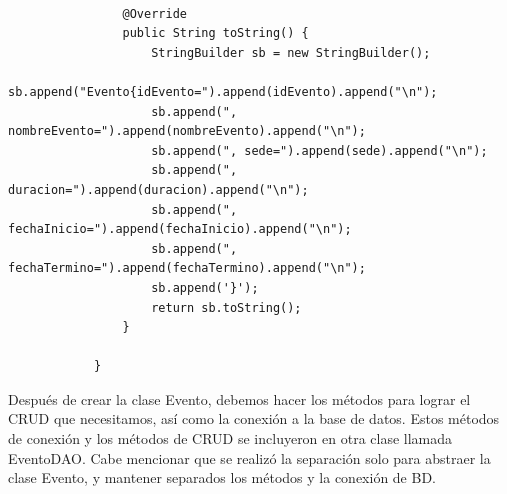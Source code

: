 \documentclass[10pt,a4paper]{article}
\begin{document}
\begin{lstlisting}
               
                @Override
                public String toString() {
                    StringBuilder sb = new StringBuilder();
                    sb.append("Evento{idEvento=").append(idEvento).append("\n");
                    sb.append(", nombreEvento=").append(nombreEvento).append("\n");
                    sb.append(", sede=").append(sede).append("\n");
                    sb.append(", duracion=").append(duracion).append("\n");
                    sb.append(", fechaInicio=").append(fechaInicio).append("\n");
                    sb.append(", fechaTermino=").append(fechaTermino).append("\n");
                    sb.append('}');
                    return sb.toString();
                }
              
            }
    	\end{lstlisting}
	\subection{\color{colorIPN}{EventoDAO}} 
	Después de crear la clase Evento, debemos hacer los métodos para lograr el CRUD que necesitamos, así como la conexión a la base de datos. Estos métodos de conexión y los métodos de CRUD se incluyeron en otra clase llamada EventoDAO. Cabe mencionar que se realizó la separación solo para abstraer la clase Evento, y mantener separados los métodos y la conexión de BD.
\end{document}
